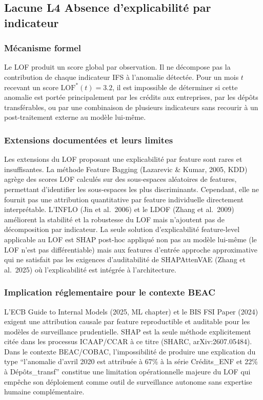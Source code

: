 \documentclass[12pt,a4paper]{article}
\begin{document}
\subsection{Lacune L4  Absence d'explicabilité par indicateur}

\subsubsection{Mécanisme formel}

Le LOF produit un score global par observation. Il ne décompose pas la
contribution de chaque indicateur IFS à l'anomalie détectée. Pour un mois
$t$ recevant un score $\mathrm{LOF}^*(t) = 3.2$, il est impossible de
déterminer si cette anomalie est portée principalement par les crédits aux
entreprises, par les dépôts transférables, ou par une combinaison de plusieurs
indicateurs  sans recourir à un post-traitement externe au modèle lui-même.

\subsubsection{Extensions documentées et leurs limites}

Les extensions du LOF proposant une explicabilité par feature sont rares et
insuffisantes. La méthode Feature Bagging (Lazarevic \& Kumar, 2005, KDD)
agrège des scores LOF calculés sur des sous-espaces aléatoires de features,
permettant d'identifier les sous-espaces les plus discriminants. Cependant,
elle ne fournit pas une attribution quantitative par feature individuelle
directement interprétable. L'INFLO (Jin et al.\ 2006) et le LDOF (Zhang et al.\
2009) améliorent la stabilité et la robustesse du LOF mais n'ajoutent pas de
décomposition par indicateur. La seule solution d'explicabilité feature-level
applicable au LOF est SHAP post-hoc appliqué non pas au modèle lui-même
(le LOF n'est pas différentiable) mais aux features d'entrée  approche
approximative qui ne satisfait pas les exigences d'auditabilité de SHAPAttenVAE
(Zhang et al.\ 2025) où l'explicabilité est intégrée à l'architecture.

\subsubsection{Implication réglementaire pour le contexte BEAC}

L'ECB Guide to Internal Models (2025, ML chapter) et le BIS FSI Paper (2024)
exigent une attribution causale par feature reproductible et auditable pour
les modèles de surveillance prudentielle. SHAP est la seule méthode
explicitement citée dans les processus ICAAP/CCAR à ce titre (SHARC,
arXiv:2607.05484). Dans le contexte BEAC/COBAC, l'impossibilité de produire
une explication du type ``l'anomalie d'avril 2020 est attribuée à 67\% à la
série Crédits\_ENF et 22\% à Dépôts\_transf'' constitue une limitation
opérationnelle majeure du LOF qui empêche son déploiement comme outil de
surveillance autonome sans expertise humaine complémentaire.
\end{document}
